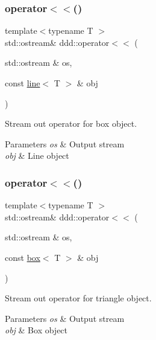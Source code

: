 \subsubsection{\texorpdfstring{operator$<$$<$()}{operator<<()}\hspace{0.1cm}{\footnotesize\ttfamily [4/10]}}
{\footnotesize\ttfamily template$<$typename T $>$ \\
std\+::ostream\& ddd\+::operator$<$$<$ (\begin{DoxyParamCaption}\item[{std\+::ostream \&}]{os,  }\item[{const \hyperlink{classddd_1_1line}{line}$<$ T $>$ \&}]{obj }\end{DoxyParamCaption})\hspace{0.3cm}{\ttfamily [inline]}}



Stream out operator for box object. 


\begin{DoxyParams}{Parameters}
{\em os} & Output stream \\
\hline
{\em obj} & Line object \\
\hline
\end{DoxyParams}
\mbox{\label{namespaceddd_af710b0f11be50190553c743ce86545a3}} 
\subsubsection{\texorpdfstring{operator$<$$<$()}{operator<<()}\hspace{0.1cm}{\footnotesize\ttfamily [5/10]}}
{\footnotesize\ttfamily template$<$typename T $>$ \\
std\+::ostream\& ddd\+::operator$<$$<$ (\begin{DoxyParamCaption}\item[{std\+::ostream \&}]{os,  }\item[{const \hyperlink{classddd_1_1box}{box}$<$ T $>$ \&}]{obj }\end{DoxyParamCaption})\hspace{0.3cm}{\ttfamily [inline]}}



Stream out operator for triangle object. 


\begin{DoxyParams}{Parameters}
{\em os} & Output stream \\
\hline
{\em obj} & Box object \\
\hline
\end{DoxyParams}
\mbox{\label{namespaceddd_a3a6f828f85e4fa306f0d950f1aab4f64}} 
